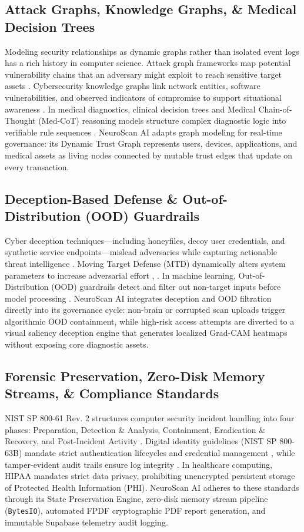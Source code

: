 \documentclass[conference]{IEEEtran}
\begin{document}
\subsection{Attack Graphs, Knowledge Graphs, \& Medical Decision Trees}
Modeling security relationships as dynamic graphs rather than isolated event logs has a rich history in computer science. Attack graph frameworks map potential vulnerability chains that an adversary might exploit to reach sensitive target assets \cite{sheyner2002}. Cybersecurity knowledge graphs link network entities, software vulnerabilities, and observed indicators of compromise to support situational awareness \cite{han2023}. In medical diagnostics, clinical decision trees and Medical Chain-of-Thought (Med-CoT) reasoning models structure complex diagnostic logic into verifiable rule sequences \cite{yatsenko2023}. NeuroScan AI adapts graph modeling for real-time governance: its Dynamic Trust Graph represents users, devices, applications, and medical assets as living nodes connected by mutable trust edges that update on every transaction.

\subsection{Deception-Based Defense \& Out-of-Distribution (OOD) Guardrails}
Cyber deception techniques—including honeyfiles, decoy user credentials, and synthetic service endpoints—mislead adversaries while capturing actionable threat intelligence \cite{han2018}. Moving Target Defense (MTD) dynamically alters system parameters to increase adversarial effort \cite{jajodia2011}, \cite{cho2020}. In machine learning, Out-of-Distribution (OOD) guardrails detect and filter out non-target inputs before model processing \cite{neupane2022}. NeuroScan AI integrates deception and OOD filtration directly into its governance cycle: non-brain or corrupted scan uploads trigger algorithmic OOD containment, while high-risk access attempts are diverted to a visual saliency deception engine that generates localized Grad-CAM heatmaps without exposing core diagnostic assets.

\subsection{Forensic Preservation, Zero-Disk Memory Streams, \& Compliance Standards}
NIST SP 800-61 Rev. 2 structures computer security incident handling into four phases: Preparation, Detection \& Analysis, Containment, Eradication \& Recovery, and Post-Incident Activity \cite{cichonski2012}. Digital identity guidelines (NIST SP 800-63B) mandate strict authentication lifecycles and credential management \cite{grassi2017}, while tamper-evident audit trails ensure log integrity \cite{ahmad2022}. In healthcare computing, HIPAA mandates strict data privacy, prohibiting unencrypted persistent storage of Protected Health Information (PHI). NeuroScan AI adheres to these standards through its State Preservation Engine, zero-disk memory stream pipeline (\texttt{BytesIO}), automated FPDF cryptographic PDF report generation, and immutable Supabase telemetry audit logging.
\end{document}
